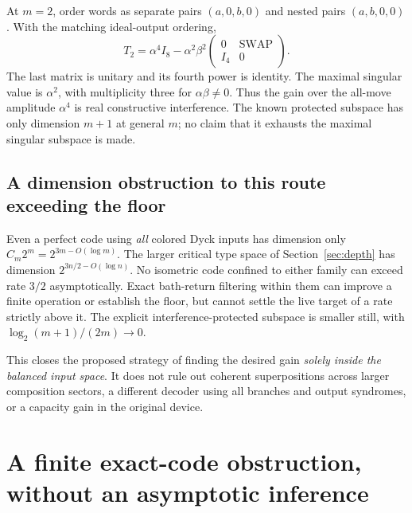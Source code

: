At $m=2$, order words as separate pairs $(a,0,b,0)$ and nested pairs $(a,b,0,0)$. With the matching ideal-output ordering,
\[
 T_2=\alpha^4I_8-\alpha^2\beta^2
 \begin{pmatrix}0&\mathrm{SWAP}\\I_4&0\end{pmatrix}.
\]
The last matrix is unitary and its fourth power is identity. The maximal singular value is $\alpha^2$, with multiplicity three for $\alpha\beta\ne0$. Thus the gain over the all-move amplitude $\alpha^4$ is real constructive interference. The known protected subspace has only dimension $m+1$ at general $m$; no claim that it exhausts the maximal singular subspace is made.

\subsection{A dimension obstruction to this route exceeding the floor}

Even a perfect code using \emph{all} colored Dyck inputs has dimension only $C_m2^m=2^{3m-O(\log m)}$. The larger critical type space of Section~\ref{sec:depth} has dimension $2^{3n/2-O(\log n)}$. No isometric code confined to either family can exceed rate $3/2$ asymptotically. Exact bath-return filtering within them can improve a finite operation or establish the floor, but cannot settle the live target of a rate strictly above it. The explicit interference-protected subspace is smaller still, with $\log_2(m+1)/(2m)\to0$.

This closes the proposed strategy of finding the desired gain \emph{solely inside the balanced input space}. It does not rule out coherent superpositions across larger composition sectors, a different decoder using all branches and output syndromes, or a capacity gain in the original device.

\section{A finite exact-code obstruction, without an asymptotic inference}\label{sec:exactobstruction}

